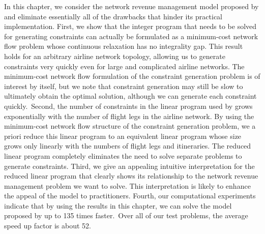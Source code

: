 In this chapter, we consider the network revenue management model proposed by  and eliminate essentially all of the drawbacks that hinder its practical implementation. First, we show that the integer program that needs to be solved for generating constraints can actually be formulated as a minimum-cost network flow problem whose continuous relaxation has no integrality gap. This result holds for an arbitrary airline network topology, allowing us to generate constraints very quickly even for large and complicated airline networks. The minimum-cost network flow formulation of the constraint generation problem is of interest by itself, but we note that constraint generation may still be slow to ultimately obtain the optimal solution, although we can generate each constraint quickly.~Second, the number of constraints in the linear program used by  grows exponentially with the number of flight legs in the airline network. By using the minimum-cost network flow structure of the constraint generation problem, we a priori reduce this linear program to an equivalent linear program whose size grows only linearly with the numbers of flight legs and itineraries. The reduced linear program completely eliminates the need to solve separate problems to generate constraints. Third, we give an appealing intuitive interpretation for the reduced linear program that clearly shows its relationship to the network revenue management problem we want to solve. This interpretation is likely to enhance the appeal of the model to practitioners. Fourth, our computational experiments indicate that by using the results in this chapter, we can solve the model proposed by  up to 135 times faster.~Over all of our test problems, the average speed up factor is about 52.


